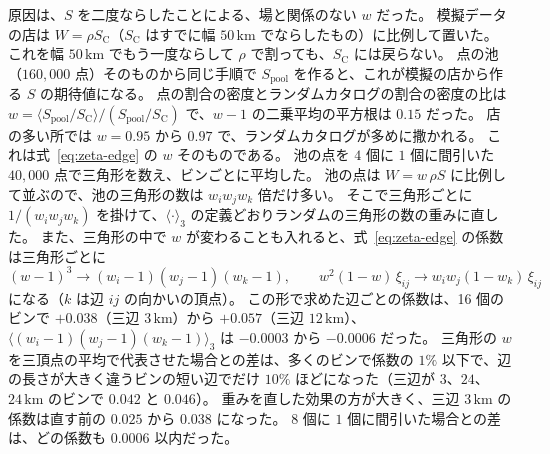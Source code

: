 \documentclass[a4paper,11pt]{ltjsarticle}
\begin{document}
原因は、$S$ を二度ならしたことによる、場と関係のない $w$ だった。
模擬データの店は $W = \rho S_{\mathrm{C}}$（$S_{\mathrm{C}}$ はすでに幅 $50\,\mathrm{km}$ でならしたもの）に比例して置いた。
これを幅 $50\,\mathrm{km}$ でもう一度ならして $\rho$ で割っても、$S_{\mathrm{C}}$ には戻らない。
点の池（$160{,}000$ 点）そのものから同じ手順で $S_{\mathrm{pool}}$ を作ると、これが模擬の店から作る $S$ の期待値になる。
点の割合の密度とランダムカタログの割合の密度の比は $w = \langle S_{\mathrm{pool}}/S_{\mathrm{C}} \rangle / (S_{\mathrm{pool}}/S_{\mathrm{C}})$ で、$w - 1$ の二乗平均の平方根は $0.15$ だった。
店の多い所では $w = 0.95$ から $0.97$ で、ランダムカタログが多めに撒かれる。
これは式~\eqref{eq:zeta-edge} の $w$ そのものである。
池の点を $4$ 個に $1$ 個に間引いた $40{,}000$ 点で三角形を数え、ビンごとに平均した。
池の点は $W = w\,\rho S$ に比例して並ぶので、池の三角形の数は $w_i w_j w_k$ 倍だけ多い。
そこで三角形ごとに $1/(w_i w_j w_k)$ を掛けて、$\langle\cdot\rangle_3$ の定義どおりランダムの三角形の数の重みに直した。
また、三角形の中で $w$ が変わることも入れると、式~\eqref{eq:zeta-edge} の係数は三角形ごとに
\begin{equation}
  (w - 1)^3 \to (w_i - 1)(w_j - 1)(w_k - 1), \qquad
  w^2 (1 - w)\,\xi_{ij} \to w_i w_j (1 - w_k)\,\xi_{ij}
  \label{eq:zeta-w-exact}
\end{equation}
になる（$k$ は辺 $ij$ の向かいの頂点）。
この形で求めた辺ごとの係数は、16 個のビンで $+0.038$（三辺 $3\,\mathrm{km}$）から $+0.057$（三辺 $12\,\mathrm{km}$）、$\langle (w_i - 1)(w_j - 1)(w_k - 1) \rangle_3$ は $-0.0003$ から $-0.0006$ だった。
三角形の $w$ を三頂点の平均で代表させた場合との差は、多くのビンで係数の $1\%$ 以下で、辺の長さが大きく違うビンの短い辺でだけ $10\%$ ほどになった（三辺が $3$、$24$、$24\,\mathrm{km}$ のビンで $0.042$ と $0.046$）。
重みを直した効果の方が大きく、三辺 $3\,\mathrm{km}$ の係数は直す前の $0.025$ から $0.038$ になった。
$8$ 個に $1$ 個に間引いた場合との差は、どの係数も $0.0006$ 以内だった。
\end{document}

